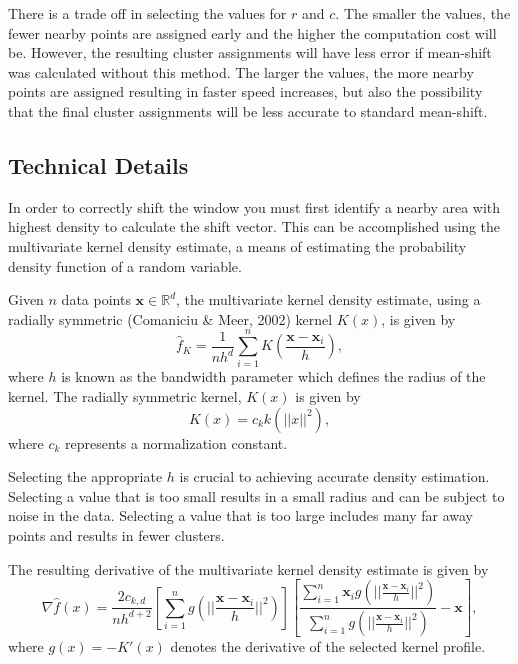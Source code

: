 \documentclass{article}
\begin{document}
There is a trade off in selecting the values for $r$ and $c$. The smaller the values, the fewer nearby points are assigned early and the higher the computation cost will be. However, the resulting cluster assignments will have less error if mean-shift was calculated without this method. The larger the values, the more nearby points are assigned resulting in faster speed increases, but also the possibility that the final cluster assignments will be less accurate to standard mean-shift.

\subsection{Technical Details}

In order to correctly shift the window you must first identify a nearby area with highest density to calculate the shift vector. This can be accomplished using the multivariate kernel density estimate, a means of estimating the probability density function of a random variable.

Given $n$ data points $\mathbf{x}\in\mathbb{R}^d$, the multivariate kernel density estimate, using a radially symmetric (Comaniciu \& Meer, 2002) kernel $K(x)$, is given by
\begin{equation}
\hat{f}_K=\frac{1}{nh^d}\sum_{i=1}^nK\left(\frac{\mathbf{x}-\mathbf{x}_i}{h}\right),
\end{equation}
where $h$ is known as the bandwidth parameter which defines the radius of the kernel. The radially symmetric kernel, $K(x)$ is given by
\begin{equation}
K(x)=c_kk(||x||^2),
\end{equation}
where $c_k$ represents a normalization constant.

Selecting the appropriate $h$ is crucial to achieving accurate density estimation. Selecting a value that is too small results in a small radius and can be subject to noise in the data. Selecting a value that is too large includes many far away points and results in fewer clusters.

The resulting derivative of the multivariate kernel density estimate is given by
\begin{equation}
\nabla\hat{f}(x)=\frac{2c_{k,d}}{nh^{d+2}}
\left[\sum_{i=1}^ng\left(||\frac{\mathbf{x}-\mathbf{x}_i}{h}||^2\right)\right]
\left[\frac{\sum_{i=1}^n\mathbf{x}_ig\left(||\frac{\mathbf{x}-\mathbf{x}_i}{h}||^2\right)}{\sum_{i=1}^ng\left(||\frac{\mathbf{x}-\mathbf{x}_i}{h}||^2\right)}-\mathbf{x}\right],
\end{equation}
where $g(x) = -K'(x)$ denotes the derivative of the selected kernel profile.
\end{document}
